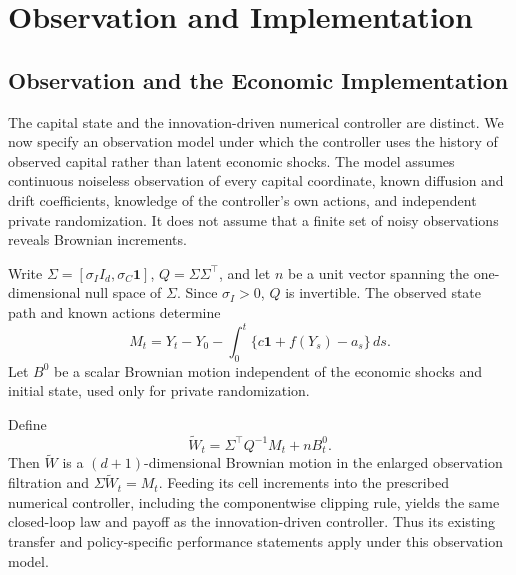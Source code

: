 \section{Observation and Implementation}\label{app:r15observationtheory}
\subsection{Observation and the Economic Implementation}\label{sec:r12observation}
The capital state and the innovation-driven numerical controller are distinct. We now specify an observation model under which the controller uses the history of observed capital rather than latent economic shocks. The model assumes continuous noiseless observation of every capital coordinate, known diffusion and drift coefficients, knowledge of the controller's own actions, and independent private randomization. It does not assume that a finite set of noisy observations reveals Brownian increments.

Write $\Sigma=[\sigma_I I_d,\sigma_C\bm1]$, $Q=\Sigma\Sigma^\top$, and let $n$ be a unit vector spanning the one-dimensional null space of $\Sigma$. Since $\sigma_I>0$, $Q$ is invertible. The observed state path and known actions determine
\[
 M_t=Y_t-Y_0-\int_0^t\{c\bm1+f(Y_s)-a_s\}\,ds.
\]
Let $B^0$ be a scalar Brownian motion independent of the economic shocks and initial state, used only for private randomization.

\begin{proposition}\label{prop:r12observation}
Define
\begin{equation}\label{eq:r12recovery}
 \widetilde W_t=\Sigma^\top Q^{-1}M_t+nB^0_t.
\end{equation}
Then $\widetilde W$ is a $(d+1)$-dimensional Brownian motion in the enlarged observation filtration and $\Sigma\widetilde W_t=M_t$. Feeding its cell increments into the prescribed numerical controller, including the componentwise clipping rule, yields the same closed-loop law and payoff as the innovation-driven controller. Thus its existing transfer and policy-specific performance statements apply under this observation model.
\end{proposition}

